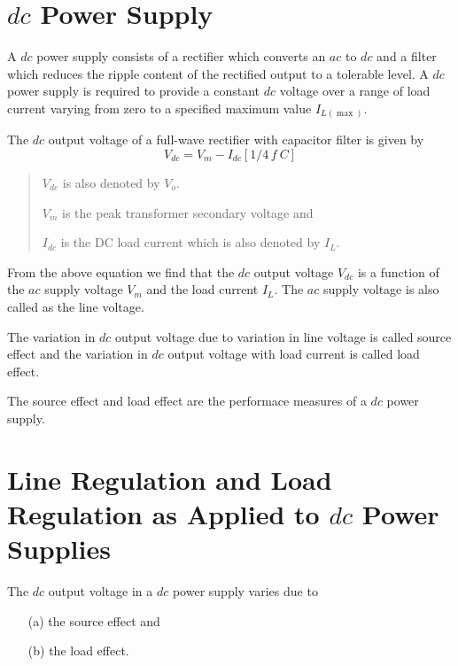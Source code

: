 \section{\boldmath$dc$ Power Supply}\label{sec2.25}

A $dc$ power supply consists of a rectifier which converts an $ac$ to $dc$ and a filter which reduces the ripple content of the rectified output to a tolerable level. A $dc$ power supply is required to provide a constant $dc$ voltage over a range of load current varying from zero to a specified maximum value $I_{L(\max)}$.

The $dc$ output voltage of a full-wave rectifier with capacitor filter is given by
\begin{equation}
V_{dc}=V_{m}-I_{dc}[1/4\, f \ C]\label{eq2.73}
\end{equation}
\begin{quote}
$V_{dc}$ is also denoted by $V_{o}$.

$V_{m}$ is the peak transformer secondary voltage and

$I_{dc}$ is the DC load current which is also denoted by $I_{L}$.
\end{quote}

From the above equation we find that the $dc$ output voltage $V_{dc}$ is a function of the $ac$ supply voltage $V_{m}$ and the load current $I_{L}$. The $ac$ supply voltage is also called as the line voltage.

The variation in $dc$ output voltage due to variation in line voltage is called source effect and the variation in $dc$ output voltage with load current is called load effect.

The source effect and load effect are the performace measures of a $dc$ power supply.

\section{Line Regulation and Load Regulation as Applied to $dc$ Power Supplies}\label{sec2.26}

The $dc$ output voltage in a $dc$ power supply varies due to
\begin{itemize}
\item[(a)] the source effect and

\item[(b)] the load effect.
\end{itemize}

